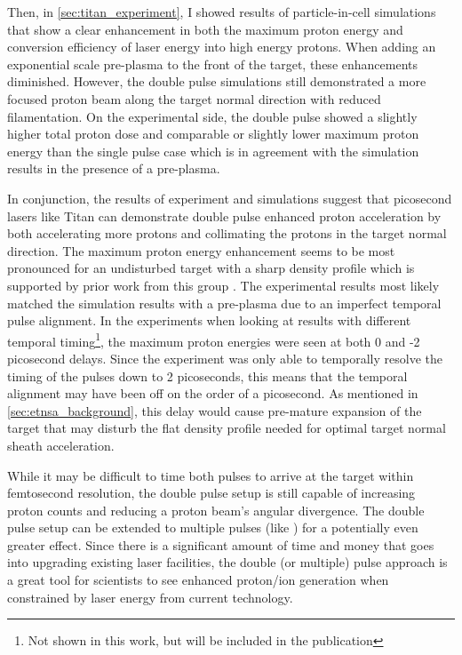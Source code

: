 Then, in \autoref{sec:titan_experiment}, I showed results of particle-in-cell simulations that show a clear enhancement in both the maximum proton energy and conversion efficiency of laser energy into high energy protons. When adding an exponential scale pre-plasma to the front of the target, these enhancements diminished. However, the double pulse simulations still demonstrated a more focused proton beam along the target normal direction with reduced filamentation. On the experimental side, the double pulse showed a slightly higher total proton dose and comparable or slightly lower maximum proton energy than the single pulse case which is in agreement with the simulation results in the presence of a pre-plasma.

In conjunction, the results of experiment and simulations suggest that picosecond lasers like Titan can demonstrate double pulse enhanced proton acceleration by both accelerating more protons and collimating the protons in the target normal direction. The maximum proton energy enhancement seems to be most pronounced for an undisturbed target with a sharp density profile which is supported by prior work from this group \cite{Rahman_2021_PoP}. The experimental results most likely matched the simulation results with a pre-plasma due to an imperfect temporal pulse alignment. In the experiments when looking at results with different temporal timing\footnote{Not shown in this work, but will be included in the publication}, the maximum proton energies were seen at both 0 and -2 picosecond delays. Since the experiment was only able to temporally resolve the timing of the pulses down to 2 picoseconds, this means that the temporal alignment may have been off on the order of a picosecond. As mentioned in \autoref{sec:etnsa_background}, this delay would cause pre-mature expansion of the target that may disturb the flat density profile needed for optimal target normal sheath acceleration. 

While it may be difficult to time both pulses to arrive at the target within femtosecond resolution, the double pulse setup is still capable of increasing proton counts and reducing a proton beam's angular divergence. The double pulse setup can be extended to multiple pulses (like \cite{Morace_2019_Nat_Comm}) for a potentially even greater effect. Since there is a significant amount of time and money that goes into upgrading existing laser facilities, the double (or multiple) pulse approach is a great tool for scientists to see enhanced proton/ion generation when constrained by laser energy from current technology.